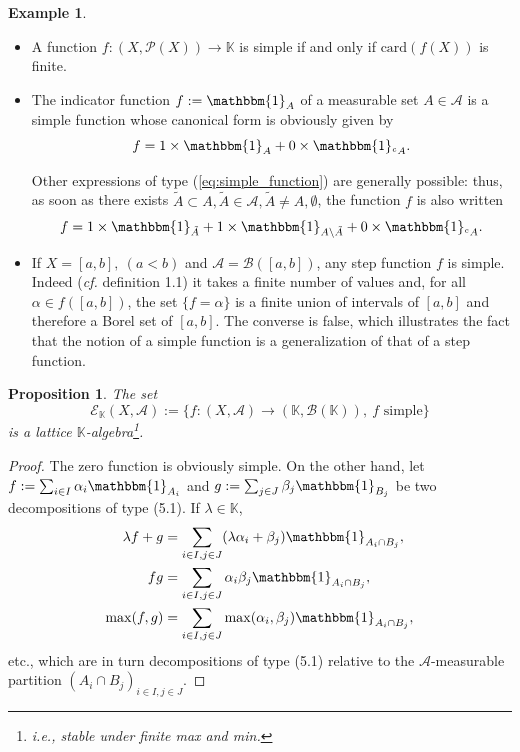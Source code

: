 \documentclass[12pt]{article}
\newtheorem{proposition}{Proposition}[section]
\theoremstyle{definition}
\newtheorem{example}{Example}[section]
\begin{document}
\begin{example}
\begin{itemize}
    \item[\textbf{1.}] A function $f : (X, \mathscr{P}(X)) \to \mathbb{K}$ is simple if and only if $\text{card}(f(X))$ is finite.

    \item[\textbf{2.}] The indicator function $f := \mathbbm{1}_A$ of a measurable set $A \in \mathscr{A}$ is a simple function whose canonical form is obviously given by
$$ f = 1 \times \mathbbm{1}_A + 0 \times \mathbbm{1}_{^c A}. $$

Other expressions of type (\ref{eq:simple_function}) are generally possible: thus, as soon as there exists $\tilde{A} \subset A, \tilde{A} \in \mathscr{A}, \tilde{A} \neq A, \emptyset$, the function $f$ is also written
$$ f = 1 \times \mathbbm{1}_{\tilde{A}} + 1 \times \mathbbm{1}_{A \setminus \tilde{A}} + 0 \times \mathbbm{1}_{^c A}. $$

    \item[\textbf{3.}] If $X = [a, b], \ (a < b)$ and $\mathscr{A} = \mathscr{B}([a, b])$, any step function $f$ is simple. Indeed (\textit{cf.} definition 1.1) it takes a finite number of values and, for all $\alpha \in f([a, b])$, the set $\{f = \alpha\}$ is a finite union of intervals of $[a, b]$ and therefore a Borel set of $[a, b]$. The converse is false, which illustrates the fact that the notion of a simple function is a generalization of that of a step function.
\end{itemize}
\end{example}

\begin{proposition}
\textit{The set}
$$ \mathscr{E}_{\mathbb{K}}(X, \mathscr{A}) := \{f : (X, \mathscr{A}) \to (\mathbb{K}, \mathscr{B}(\mathbb{K})), \ f \text{ simple} \} $$
\textit{is a lattice $\mathbb{K}$-algebra\footnote{\textit{i.e.}, stable under finite max and min.}.}
\end{proposition}
\begin{proof}
The zero function is obviously simple. On the other hand, let $f := \sum_{i \in I} \alpha_i \mathbbm{1}_{A_i}$ and $g := \sum_{j \in J} \beta_j \mathbbm{1}_{B_j}$ be two decompositions of type (5.1). If $\lambda \in \mathbb{K}$,
\begin{align*}
\lambda f + g &= \sum_{i \in I, j \in J} (\lambda \alpha_i + \beta_j) \mathbbm{1}_{A_i \cap B_j}, \\
f g &= \sum_{i \in I, j \in J} \alpha_i \beta_j \mathbbm{1}_{A_i \cap B_j}, \\
\max(f, g) &= \sum_{i \in I, j \in J} \max(\alpha_i, \beta_j) \mathbbm{1}_{A_i \cap B_j},
\end{align*}
etc., which are in turn decompositions of type (5.1) relative to the $\mathscr{A}$-measurable partition $(A_i \cap B_j)_{i \in I, j \in J}$.
\end{proof}
\end{document}
